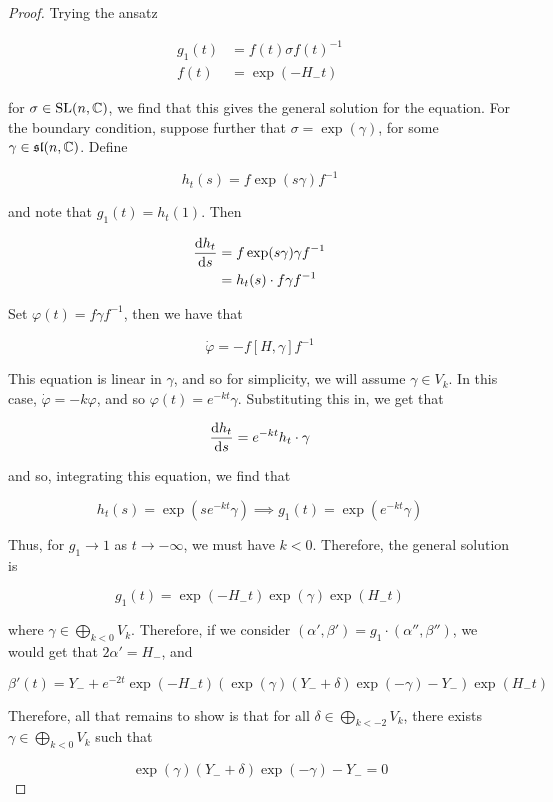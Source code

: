 \documentclass{report}
\renewcommand{\sl}{\mathfrak{sl}}
\begin{document}
\begin{proof}
    Trying the ansatz

    \begin{align*}
        g_1(t) &= f(t)\sigma f(t)^{-1} \\
        f(t) &= \exp(-H_- t)
    \end{align*}

    for \(\sigma \in \operatorname{SL}(n, \mathbb{C})\), we find that this gives the general solution for the equation. For the boundary condition, suppose further that \(\sigma = \exp(\gamma)\), for some \(\gamma \in \sl(n, \C)\). Define

    \[h_t(s) = f\exp(s\gamma)f^{-1}\]

    and note that \(g_1(t) = h_t(1)\). Then

    \begin{align*}
        \dv{h_t}{s}(s) &= f \exp(s\gamma)\gamma f^{-1} \\
        &= h_t(s) \cdot f \gamma f^{-1}
    \end{align*}

    Set \(\varphi(t) = f\gamma f^{-1}\), then we have that

    \[\dot\varphi = -f[H, \gamma]f^{-1}\]

    This equation is linear in \(\gamma\), and so for simplicity, we will assume \(\gamma \in V_k\). In this case, \(\dot\varphi = -k\varphi\), and so \(\varphi(t) = e^{-kt}\gamma\). Substituting this in, we get that

    \[\dv{h_t}{s} = e^{-kt}h_t \cdot \gamma\]

    and so, integrating this equation, we find that

    \[h_t(s) = \exp(se^{-kt}\gamma) \implies g_1(t) = \exp(e^{-kt}\gamma)\]

    Thus, for \(g_1 \to 1\) as \(t \to -\infty\), we must have \(k < 0\). Therefore, the general solution is

    \[g_1(t) = \exp(-H_-t)\exp(\gamma)\exp(H_-t)\]

    where \(\gamma \in \bigoplus\limits_{k < 0}V_k\). Therefore, if we consider \((\alpha', \beta') = g_1 \cdot (\alpha'', \beta'')\), we would get that \(2\alpha' = H_-\), and

    \[\beta'(t) = Y_- + e^{-2t}\exp(-H_-t)(\exp(\gamma)(Y_- + \delta)\exp(-\gamma) - Y_-)\exp(H_-t)\]

    Therefore, all that remains to show is that for all \(\delta \in \bigoplus\limits_{k < -2}V_k\), there exists \(\gamma \in \bigoplus\limits_{k < 0}V_k\) such that

    \[\exp(\gamma)(Y_- + \delta)\exp(-\gamma) - Y_- = 0\]


\end{proof}
\end{document}
